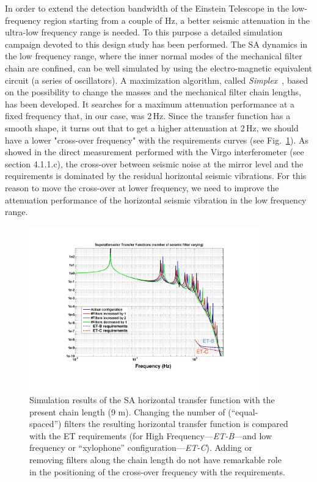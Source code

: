 In order to extend the detection bandwidth of the Einstein Telescope in the low-frequency region starting from a couple of Hz, a better seismic attenuation in the ultra-low frequency range is needed. To this purpose a detailed simulation campaign devoted to this design study has been performed. The SA dynamics in the low frequency range, where the inner normal modes of the mechanical filter chain are confined, can be well simulated by using the electro-magnetic equivalent circuit (a series of oscillators). 
A maximization algorithm, called \emph{Simplex}~\cite{Different2008_SecondEdition}, based on the possibility to change the masses and the mechanical filter chain lengths, has been developed. It searches for a maximum attenuation performance at a fixed frequency that, in our case, was 2\,Hz.  Since the transfer function has a smooth shape, it turns out that to get a higher attenuation at 2\,Hz, we should have a lower  "cross-over frequency" with the requirements curves (see Fig.~\ref{Par4Fig1}). As showed in the direct measurement performed with the Virgo interferometer (see section 4.1.1.c), the cross-over between seismic noise at the mirror level and the requirements is dominated by the residual horizontal seismic vibrations. For this reason to move the cross-over at lower frequency, we need to improve  the attenuation performance of the horizontal seismic vibration in the low frequency range.
%
\begin{figure}[t]
	\begin{center}
		\includegraphics[width=0.9\textwidth]{./Sec_Suspensions/Figures/Par4-Fig1.pdf}
			\caption{Simulation results of the SA horizontal transfer function with the present chain length (9 m). Changing the number of (``equal-spaced'') filters the resulting horizontal transfer function is compared with the ET requirements (for High Frequency---\emph{ET-B}---and low frequency or ``xylophone'' configuration---\emph{ET-C}). Adding or removing filters along the chain length do not have remarkable role in the positioning of the cross-over frequency with the requirements.}
\label{Par4Fig1}
	\end{center}
\end{figure}
